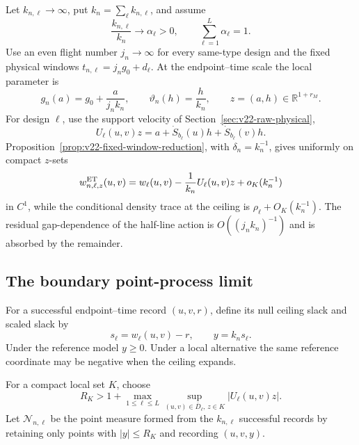 Let \(k_{n,\ell}\to\infty\), put \(k_n=\sum_\ell k_{n,\ell}\), and assume
\begin{equation}\label{eq:v23-et-design-proportions}
 \frac{k_{n,\ell}}{k_n}\longrightarrow\alpha_\ell>0,
 \qquad \sum_{\ell=1}^L\alpha_\ell=1.
\end{equation}
Use an even flight number \(j_n\to\infty\) for every same-type design and the
fixed physical windows \(t_{n,\ell}=j_ng_0+d_\ell\).  At the endpoint--time
scale the local parameter is
\begin{equation}\label{eq:v23-et-local-parameter}
 g_n(a)=g_0+\frac{a}{j_nk_n},
 \qquad
 \vartheta_n(h)=\frac{h}{k_n},
 \qquad z=(a,h)\in\mathbb R^{1+r_M}.
\end{equation}
For design \(\ell\), use the support velocity of
Section~\ref{sec:v22-raw-physical},
\begin{equation}\label{eq:v23-et-support-velocity}
 U_\ell(u,v)z
 =a+\dot S_{b_\ell}(u)h+\dot S_{b_\ell}(v)h.
\end{equation}
Proposition~\ref{prop:v22-fixed-window-reduction}, with
\(\delta_n=k_n^{-1}\), gives uniformly on compact \(z\)-sets
\begin{equation}\label{eq:v23-et-ceiling-expansion}
 w^{\rm ET}_{n,\ell,z}(u,v)
 =w_\ell(u,v)-\frac1{k_n}U_\ell(u,v)z
   +o_K(k_n^{-1})
\end{equation}
in \(C^1\), while the conditional density trace at the ceiling is
\(\rho_\ell+O_K(k_n^{-1})\).  The residual gap-dependence of the half-line
action is \(O((j_nk_n)^{-1})\) and is absorbed by the remainder.

\subsection{The boundary point-process limit}

For a successful endpoint--time record \((u,v,r)\), define its null ceiling
slack and scaled slack by
\[
 s_\ell=w_\ell(u,v)-r,\qquad y=k_ns_\ell.
\]
Under the reference model \(y\ge0\).  Under a local alternative the same
reference coordinate may be negative when the ceiling expands.

For a compact local set \(K\), choose
\begin{equation}\label{eq:v23-et-RK}
 R_K>1+\max_{1\le\ell\le L}
 \sup_{(u,v)\in\overline D_\ell,\,z\in K}|U_\ell(u,v)z|.
\end{equation}
Let \(\mathcal N_{n,\ell}\) be the point measure formed from the
\(k_{n,\ell}\) successful records by retaining only points with
\(|y|\le R_K\) and recording \((u,v,y)\).

